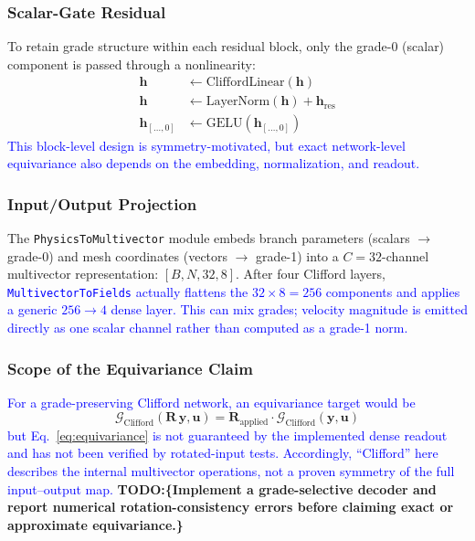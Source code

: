 \documentclass[journal]{IEEEtran}
\newcommand{\added}[1]{\textcolor{blue}{#1}}
\newcommand{\todo}[1]{\textcolor{green!50!black}{\textbf{TODO:\{#1\}}}}
\begin{document}
\subsubsection{Scalar-Gate Residual}
To retain grade structure within each residual block, only the grade-0 (scalar) component is passed through a nonlinearity:
\begin{align}
\bm{h} &\leftarrow \text{CliffordLinear}(\bm{h}) \\
\bm{h} &\leftarrow \text{LayerNorm}(\bm{h}) + \bm{h}_\text{res} \\
\bm{h}_{[\ldots, 0]} &\leftarrow \text{GELU}(\bm{h}_{[\ldots, 0]}) \label{eq:scalar_gate}
\end{align}
 \added{This block-level design is symmetry-motivated, but exact network-level equivariance also depends on the embedding, normalization, and readout.}

\subsubsection{Input/Output Projection}
The \texttt{PhysicsToMultivector} module embeds branch parameters (scalars $\to$ grade-0) and mesh coordinates (vectors $\to$ grade-1) into a $C = 32$-channel multivector representation: $[B,N,32,8]$. After four Clifford layers,  \added{\texttt{MultivectorToFields} actually flattens the $32\times8=256$ components and applies a generic $256\to4$ dense layer. This can mix grades; velocity magnitude is emitted directly as one scalar channel rather than computed as a grade-1 norm.}

\subsubsection{Scope of the Equivariance Claim}
 \added{For a grade-preserving Clifford network, an equivariance target would be}
{\color{blue}
\begin{equation}
\mathcal{G}_\text{Clifford}(\bm{R}\,\bm{y}, \bm{u}) = \bm{R}_\text{applied} \cdot \mathcal{G}_\text{Clifford}(\bm{y}, \bm{u})
\label{eq:equivariance}
\end{equation}}
\added{but Eq.~\eqref{eq:equivariance} is not guaranteed by the implemented dense readout and has not been verified by rotated-input tests. Accordingly, ``Clifford'' here describes the internal multivector operations, not a proven symmetry of the full input--output map.} \todo{Implement a grade-selective decoder and report numerical rotation-consistency errors before claiming exact or approximate equivariance.}
\end{document}
